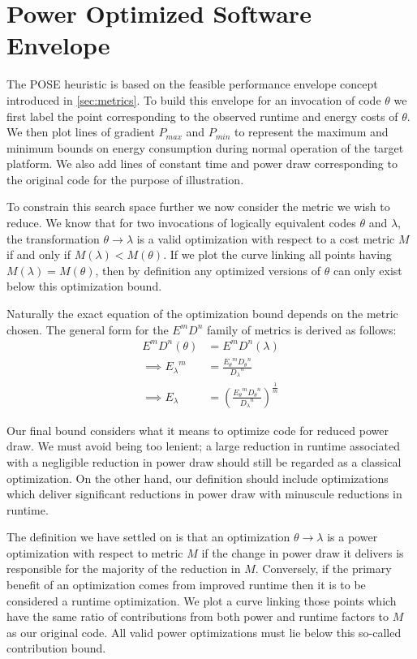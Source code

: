 \section{Power Optimized Software Envelope}
\label{sec:pose}

The POSE heuristic is based on the feasible performance envelope concept introduced in \autoref{sec:metrics}.
To build this envelope for an invocation of code $\theta$  we first label the point corresponding to the observed runtime and energy costs of $\theta$. We then plot lines of gradient $P_{max}$ and $P_{min}$ to represent the maximum and minimum bounds on energy consumption during normal operation of the target platform. We also add lines of constant time and power draw corresponding to the original code for the purpose of illustration.

To constrain this search space further we now consider the metric we wish to reduce. We know that for two invocations of logically equivalent codes $\theta$ and $\lambda$, the transformation $\theta \to \lambda$ is a valid optimization with respect to a cost metric $M$ if and only if $M(\lambda) < M(\theta)$. If we plot the curve linking all points having $M(\lambda) = M(\theta)$, then by definition any optimized versions of $\theta$ can only exist below this optimization bound.

Naturally the exact equation of the optimization bound depends on the metric chosen. 
The general form for the $E^mD^n$ family of metrics is derived as follows:
\begin{align}
E^mD^n(\theta) &= E^mD^n(\lambda) \nonumber \\
\implies {E_\lambda}^m &= \frac{{E_\theta}^m{D_\theta}^n}{{D_\lambda}^n} \nonumber \\
\implies E_\lambda &= (\frac{{E_\theta}^m{D_\theta}^n}{{D_\lambda}^n})^\frac{1}{m}
\end{align}

Our final bound considers what it means to optimize code for reduced power draw. We must avoid being too lenient; a large reduction in runtime associated with a negligible reduction in power draw should still be regarded as a classical optimization. On the other hand, our definition should include optimizations which deliver significant reductions in power draw with minuscule reductions in runtime. 

The definition we have settled on is that an optimization $\theta \to \lambda$ is a power optimization with respect to metric $M$ if the change in power draw it delivers is responsible for the majority of the reduction in $M$. Conversely, if the primary benefit of an optimization comes from improved runtime then it is to be considered a runtime optimization. We plot a curve linking those points which have the same ratio of contributions from both power and runtime factors to $M$ as our original code. All valid power optimizations must lie below this so-called contribution bound. 

